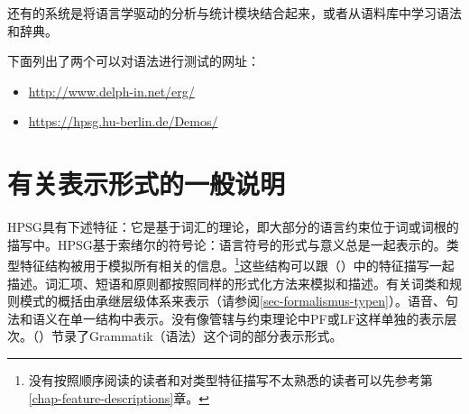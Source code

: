还有的系统是将语言学驱动的分析与统计模块结合起来\citep{Brew95a,MNT2005a-u,MT2008a-u}，或者从语料库中学习语法和辞典\citep{Fouvry2003a-u,CZ2009a-u}。

下面列出了两个可以对语法进行测试的网址：
\begin{itemize}
\item \url{http://www.delph-in.net/erg/}
\item \url{https://hpsg.hu-berlin.de/Demos/}
\end{itemize}


\section{有关表示形式的一般说明}

HPSG具有下述特征：它是基于词汇的理论，即大部分的语言约束位于词或词根的描写中。HPSG基于索绪尔的符号论：语言符号的形式与意义总是一起表示的。类型特征结构被用于模拟所有相关的信息。\footnote{没有按照顺序阅读的读者和对类型特征描写不太熟悉的读者可以先参考第\ref{chap-feature-descriptions}章。
}这些结构可以跟（）中的特征描写一起描述。词汇项、短语和原则都按照同样的形式化方法来模拟和描述。有关词类和规则模式的概括由承继层级体系来表示（请参阅\ref{sec-formalismus-typen}）。语音、句法和语义在单一结构中表示。没有像管辖与约束理论中PF或LF这样单独的表示层次。（）节录了Grammatik（语法）这个词的部分表示形式。

